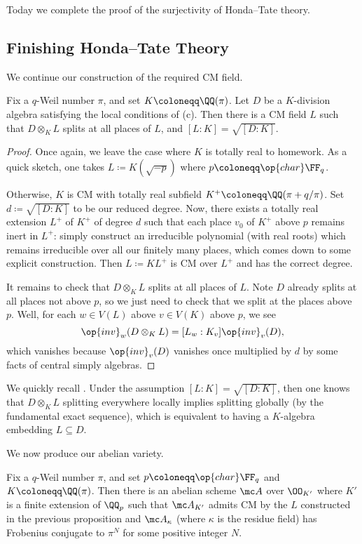\documentclass[../notes.tex]{subfiles}
\begin{document}
Today we complete the proof of the surjectivity of Honda--Tate theory.

\subsection{Finishing Honda--Tate Theory}
We continue our construction of the required CM field.
\begin{proposition}
	Fix a $q$-Weil number $\pi$, and set $K\coloneqq\QQ(\pi)$. Let $D$ be a $K$-division algebra satisfying the local conditions of (c). Then there is a CM field $L$ such that $D\otimes_KL$ splits at all places of $L$, and $[L:K]=\sqrt{[D:K]}$.
\end{proposition}
\begin{proof}
	Once again, we leave the case where $K$ is totally real to homework. As a quick sketch, one takes $L\coloneqq K(\sqrt{-p})$ where $p\coloneqq\op{char}\FF_q$.

	Otherwise, $K$ is CM with totally real subfield $K^+\coloneqq\QQ(\pi+q/\pi)$. Set $d\coloneqq\sqrt{[D:K]}$ to be our reduced degree. Now, there exists a totally real extension $L^+$ of $K^+$ of degree $d$ such that each place $v_0$ of $K^+$ above $p$ remains inert in $L^+$: simply construct an irreducible polynomial (with real roots) which remains irreducible over all our finitely many places, which comes down to some explicit construction. Then $L\coloneqq KL^+$ is CM over $L^+$ and has the correct degree.

	It remains to check that $D\otimes_KL$ splits at all places of $L$. Note $D$ already splits at all places not above $p$, so we just need to check that we split at the places above $p$. Well, for each $w\in V(L)$ above $v\in V(K)$ above $p$, we see
	\[\op{inv}_w(D\otimes_KL)=[L_w:K_v]\op{inv}_v(D),\]
	which vanishes because $\op{inv}_v(D)$ vanishes once multiplied by $d$ by some facts of central simply algebras.
\end{proof}
\begin{remark}
	We quickly recall \cite[Corollary~IV.3.7]{milne-cft}. Under the assumption $[L:K]=\sqrt{[D:K]}$, then one knows that $D\otimes_KL$ splitting everywhere locally implies splitting globally (by the fundamental exact sequence), which is equivalent to having a $K$-algebra embedding $L\subseteq D$.
\end{remark}
We now produce our abelian variety.
\begin{proposition}
	Fix a $q$-Weil number $\pi$, and set $p\coloneqq\op{char}\FF_q$ and $K\coloneqq\QQ(\pi)$. Then there is an abelian scheme $\mc A$ over $\OO_{K'}$ where $K'$ is a finite extension of $\QQ_p$ such that $\mc A_{K'}$ admits CM by the $L$ constructed in the previous proposition and $\mc A_\kappa$ (where $\kappa$ is the residue field) has Frobenius conjugate to $\pi^N$ for some positive integer $N$.
\end{proposition}
\end{document}
